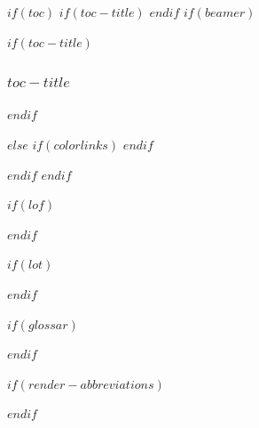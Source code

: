 $if(toc)$
$if(toc-title)$
\renewcommand*\contentsname{$toc-title$}
$endif$
$if(beamer)$
\begin{frame}[allowframebreaks]
$if(toc-title)$
  \frametitle{$toc-title$}
$endif$
  \tableofcontents[hideallsubsections]
\end{frame}
$else$
{
$if(colorlinks)$
\hypersetup{linkcolor=$if(toccolor)$$toccolor$$else$$endif$}
$endif$
\setcounter{tocdepth}{$toc-depth$}
\tableofcontents
}

\clearpage
$endif$
$endif$

\clearpage

$if(lof)$

\clearpage
$endif$

\clearpage

$if(lot)$

\clearpage
$endif$

\clearpage

$if(glossar)$

\clearpage
$endif$

\clearpage

$if(render-abbreviations)$

\clearpage
$endif$

\clearpage
{}